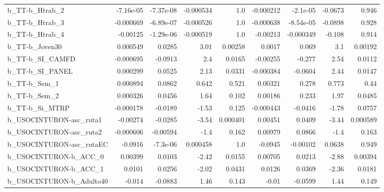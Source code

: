 \begin{tabular}{lrrrrrrrr}
b\_TT-b\_Htrab\_2             &   -7.16e-05 &    -7.37e-08 & -0.000534 &      1.0 &  -0.000212 &    -2.1e-05 &      -0.0673 &         0.946 \\
b\_TT-b\_Htrab\_3             &   -0.000669 &    -6.89e-07 & -0.000526 &      1.0 &  -0.000638 &   -8.54e-05 &      -0.0898 &         0.928 \\
b\_TT-b\_Htrab\_4             &    -0.00125 &    -1.29e-06 & -0.000519 &      1.0 &   -0.00213 &   -0.000349 &       -0.108 &         0.914 \\
b\_TT-b\_Joven30             &    0.000549 &       0.0285 &      3.01 &  0.00258 &     0.0017 &       0.069 &          3.1 &       0.00192 \\
b\_TT-b\_SI\_CAMFD            &   -0.000695 &      -0.0913 &       2.4 &   0.0165 &   -0.00255 &      -0.277 &         2.54 &        0.0112 \\
b\_TT-b\_SI\_PANEL            &    0.000299 &       0.0525 &      2.13 &   0.0331 &  -0.000384 &     -0.0604 &         2.44 &        0.0147 \\
b\_TT-b\_Sem\_1               &    0.000894 &       0.0862 &     0.642 &    0.521 &    0.00321 &       0.278 &        0.773 &          0.44 \\
b\_TT-b\_Sem\_2               &    0.000326 &       0.0456 &      1.64 &    0.102 &    0.00186 &       0.233 &         1.97 &        0.0485 \\
b\_TT-b\_Si\_MTRP             &   -0.000178 &      -0.0189 &     -1.53 &    0.125 &  -0.000443 &     -0.0416 &        -1.78 &        0.0757 \\
b\_USOCINTURON-asc\_ruta1    &    -0.00274 &      -0.0285 &     -3.54 & 0.000401 &    0.00451 &      0.0409 &        -3.44 &      0.000589 \\
b\_USOCINTURON-asc\_ruta2    &   -0.000606 &     -0.00594 &      -1.4 &    0.162 &    0.00979 &      0.0866 &         -1.4 &         0.163 \\
b\_USOCINTURON-asc\_rutaEC   &     -0.0916 &     -7.3e-06 &  0.000458 &      1.0 &    -0.0945 &    -0.00102 &       0.0638 &         0.949 \\
b\_USOCINTURON-b\_ACC\_0      &     0.00399 &       0.0103 &     -2.42 &   0.0155 &    0.00705 &      0.0213 &        -2.88 &       0.00394 \\
b\_USOCINTURON-b\_ACC\_1      &      0.0101 &       0.0256 &     -2.02 &   0.0431 &     0.0126 &      0.0369 &        -2.36 &        0.0181 \\
b\_USOCINTURON-b\_Adulto40   &      -0.014 &      -0.0883 &      1.46 &    0.143 &      -0.01 &     -0.0599 &         1.44 &         0.149 \\

\end{tabular}
